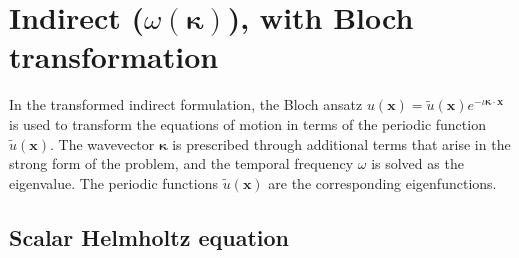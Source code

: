 \documentclass{article}
\newcommand{\imag}{\iota}
\newcommand{\vect}[1]{\boldsymbol{#1}}
\newcommand{\x}{x}
\newcommand{\vecx}{\vect{\x}}
\newcommand{\wavenum}{\kappa}
\newcommand{\wavevec}{\vect{\wavenum}}
\newcommand{\bloch}{e^{-\imag \wavevec \cdot \vecx}}
\newcommand{\kernel}[1]{\tilde{#1}}
\begin{document}
\section{Indirect ($\omega(\wavevec)$), with Bloch transformation}
In the transformed indirect formulation, the Bloch ansatz \(u(\vecx) = \kernel{u}(\vecx) \bloch\) is used to transform the equations of motion in terms of the periodic function \(\kernel{u}(\vecx)\). The wavevector \(\wavevec\) is prescribed through additional terms that arise in the strong form of the problem, and the temporal frequency \(\omega\) is solved as the eigenvalue. The periodic functions \(\kernel{u}(\vecx)\) are the corresponding eigenfunctions.


\subsection{Scalar Helmholtz equation}
\end{document}
